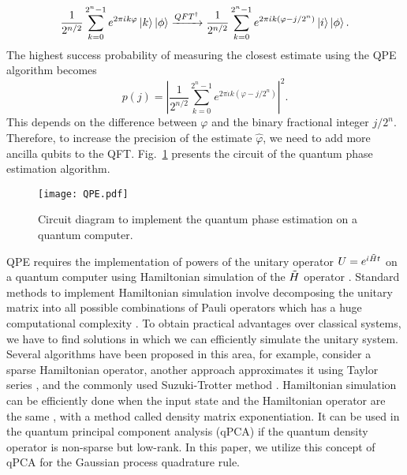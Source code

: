 \documentclass[10pt]{article}
\begin{document}
	\begin{equation}
		\frac{1}{2^{n/2}} \sum_{k=0}^{2^{n}-1} e^{2\pi \dot{\iota}k\varphi}\ket{k}\ket{\phi}\xrightarrow[]{QFT^{\dagger}}\frac{1}{2^{n/2}} \sum_{k=0}^{2^{n}-1} e^{2\pi \dot{\iota}k\left(\varphi-j/2^{n}\right)}\ket{i}\ket{\phi}. 
	\end{equation}
	The highest success probability of measuring the closest estimate using the QPE algorithm becomes
	\begin{equation}
		p(j)= \left|\frac{1}{2^{n/2}} \sum_{k=0}^{2^{n}-1} e^{2\pi \dot{\iota}k\left(\varphi-j/2^{n}\right)}\right|^{2}.
	\end{equation}
	This depends on the difference between $\varphi$ and the binary fractional integer $j/2^{n}$. Therefore, to increase the precision of the estimate $\hat{\varphi}$, we need to add more ancilla qubits to the QFT. Fig.~\ref{fig:2}
	presents the circuit of the quantum phase estimation algorithm.
	
	\begin{figure}[tb!]
		\centering
		\texttt{[image: QPE.pdf]}
		\caption{ Circuit diagram to implement the quantum phase estimation on a quantum computer.}
		\label{fig:2}
	\end{figure}
	QPE requires the implementation of powers of the unitary operator $U=e^{\dot{\iota}\Tilde{H} t}$ on a quantum computer using Hamiltonian simulation of the $\Tilde{H}$ operator \citep{Lloyd1996UniversalQS}.
	Standard methods to implement Hamiltonian simulation involve decomposing the unitary matrix into all possible combinations of Pauli operators which has a huge computational complexity \citep{Nielsen2011QuantumComputing}. 
	To obtain practical advantages over classical systems, we have to find solutions in which we can efficiently simulate the unitary system. 
	Several algorithms have been proposed in this area, for example, \citet{berry2007efficient} consider a sparse Hamiltonian operator, another approach approximates it using Taylor series \citep{Berry2015TruncatedTaylor}, and the commonly used Suzuki-Trotter method \citep{Suzuki1976Suzuki-trotter}.
	Hamiltonian simulation can be efficiently done when the input state and the Hamiltonian operator are the same \citep{Lloyd2014QPCA}, with a method called density matrix exponentiation.
	It can be used in the quantum principal component analysis (qPCA)  if the quantum density operator is non-sparse but low-rank.
	In this paper, we utilize this concept of qPCA for the Gaussian process quadrature rule.
	
\end{document}
